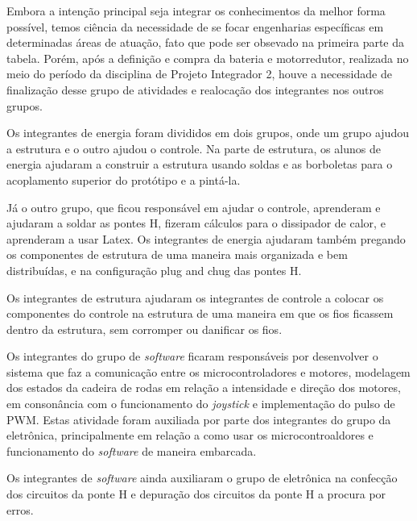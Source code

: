 Embora a intenção principal seja integrar os conhecimentos da melhor forma possível, temos ciência da necessidade de se focar engenharias específicas em determinadas áreas de atuação, fato que pode ser obsevado na primeira parte da tabela. Porém, após a definição e compra da bateria e motorredutor, realizada no meio do período da disciplina de Projeto Integrador 2, houve a necessidade de finalização desse grupo de atividades e realocação dos integrantes nos outros grupos.

Os integrantes de energia foram divididos em dois grupos, onde um grupo ajudou a
estrutura e o outro ajudou o controle. Na parte de estrutura, os alunos de energia ajudaram a construir a estrutura usando soldas e as borboletas para o acoplamento superior do protótipo e a pintá-la.

Já o outro grupo, que ficou responsável em ajudar o controle, aprenderam e ajudaram a soldar as pontes H, fizeram cálculos para o dissipador de calor, e aprenderam a usar Latex. Os integrantes de energia ajudaram também pregando os componentes de estrutura de uma maneira mais organizada e bem distribuídas, e na configuração plug and chug das pontes H.

Os integrantes de estrutura ajudaram os integrantes de controle a colocar os componentes do controle na estrutura de uma maneira em que os fios ficassem dentro da estrutura, sem corromper ou danificar os fios.

Os integrantes do grupo de \textit{software} ficaram responsáveis por desenvolver o sistema que faz a comunicação entre os microcontroladores e motores, modelagem dos estados da cadeira de rodas em relação a intensidade e direção dos motores, em consonância com o funcionamento do \textit{joystick} e implementação do pulso de PWM. Estas atividade foram auxiliada por parte dos integrantes do grupo da eletrônica, principalmente em relação a como usar os microcontroaldores e funcionamento do \textit{software} de maneira embarcada.

Os integrantes de \textit{software} ainda auxiliaram o grupo de eletrônica na confecção dos circuitos da ponte H e depuração dos circuitos da ponte H a procura por erros.
